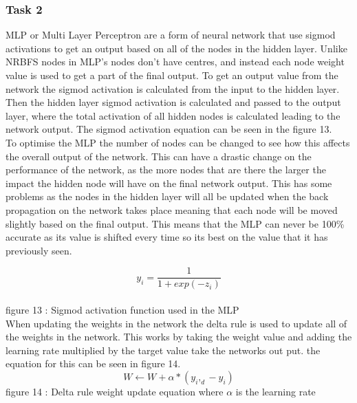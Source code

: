 \documentclass{IEEEtran}[11pt]
\begin{document}
\subsubsection{Task 2}
\begin{flushleft}
  MLP or Multi Layer Perceptron are a form of neural network that use sigmod activations
  to get an output based on all of the nodes in the hidden layer. Unlike NRBFS nodes in
  MLP's nodes don't have centres, and instead each node weight value is used to get a
  part of the final output. To get an output value from the network the sigmod activation
  is calculated from the input to the hidden layer. Then the hidden layer sigmod activation
  is calculated and passed to the output layer, where the total activation of all hidden
  nodes is calculated leading to the network output. The sigmod activation
  equation can be seen in the figure 13.
  \\
  \vspace{1.5mm}
  To optimise the MLP the number of nodes can be changed to see how this affects
  the overall output of the network. This can have a drastic change on the
  performance of the network, as the more nodes that are there the larger the
  impact the hidden node will have on the final network output. This has some
  problems as the nodes in the hidden layer will all be updated when the back
  propagation on the network takes place meaning that each node will be moved
  slightly based on the final output. This means that the MLP can never be 100\%
  accurate as its value is shifted every time so its best on the value that it
  has previously seen.

  $$y_i=\frac{1}{1+exp(-z_i)}$$
  \\
  \vspace{1.5mm}
  {\footnotesize figure 13 : Sigmod activation function used in the MLP}
  \\
  \vspace{1.5mm}
  When updating the weights in the network the delta rule is used to update all of
  the weights in the network. This works by taking the weight value and adding
  the learning rate multiplied by the target value take the networks out put.
   the equation for this can be seen in figure 14.
  $$W \leftarrow W  + \alpha*(y_i,_d - y_i)$$
  {\footnotesize figure 14 : Delta rule weight update equation where $\alpha$ is the learning
  rate}
  \\
  \vspace{1.5mm}


\end{flushleft}
\end{document}
